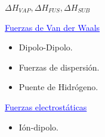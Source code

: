         \begin{center} $\Delta H_{VAP}, \Delta H_{FUS}, \Delta H_{SUB}$ \end{center}
        \begin{center} \textcolor{blue}{\underline{Fuerzas de Van der Waals}} \end{center}
        \begin{itemize} 
            \item Dipolo-Dipolo.
            \item Fuerzas de dispersión.
            \item Puente de Hidrógeno.
        \end{itemize}
        \begin{center} \textcolor{blue}{\underline{Fuerzas electrostáticas}} \end{center}
        \begin{itemize}
            \item Ión-dipolo.
        \end{itemize}
